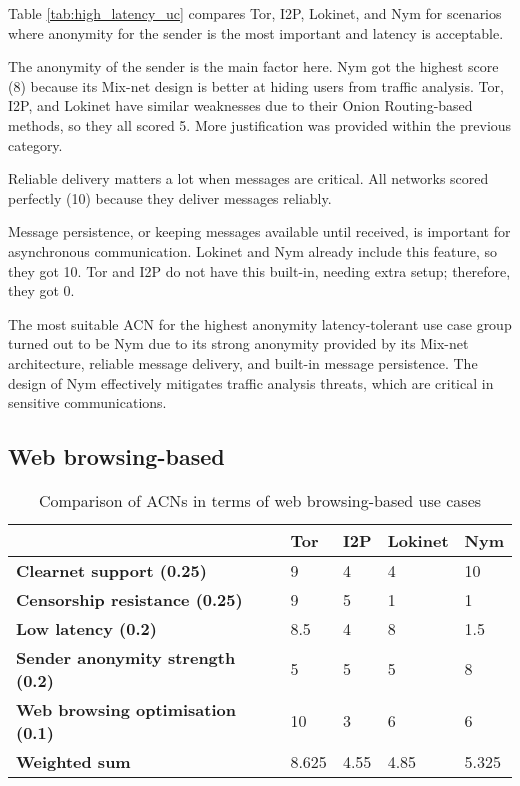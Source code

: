 Table \ref{tab:high_latency_uc} compares Tor, I2P, Lokinet, and Nym for scenarios where anonymity for the sender is the most important and latency is acceptable.

The anonymity of the sender is the main factor here. Nym got the highest score (8) because its Mix-net design is better at hiding users from traffic analysis. Tor, I2P, and Lokinet have similar weaknesses due to their Onion Routing-based methods, so they all scored 5. More justification was provided within the previous category.

Reliable delivery matters a lot when messages are critical. All networks scored perfectly (10) because they deliver messages reliably.

Message persistence, or keeping messages available until received, is important for asynchronous communication. Lokinet and Nym already include this feature, so they got 10. Tor and I2P do not have this built-in, needing extra setup; therefore, they got 0.

The most suitable ACN for the highest anonymity latency-tolerant use case group turned out to be Nym due to its strong anonymity provided by its Mix-net architecture, reliable message delivery, and built-in message persistence. The design of Nym effectively mitigates traffic analysis threats, which are critical in sensitive communications.

\subsection{Web browsing-based}

\begin{table}[!ht]
\caption{Comparison of ACNs in terms of web browsing-based use cases}
\label{tab:web_browsing_uc}
\small
\begin{tabular}{|p{}|p{}|p{}|p{}|p{}|}
\hline
\textbf{} & \textbf{Tor} & \textbf{I2P} & \textbf{Lokinet} & \textbf{Nym} \\
\hline
\textbf{Clearnet support (0.25)} & 9 & 4 & 4 & 10 \\
\hline
\textbf{Censorship resistance (0.25)} & 9 & 5 & 1 & 1 \\
\hline
\textbf{Low latency (0.2)} & 8.5 & 4 & 8 & 1.5 \\
\hline
\textbf{Sender anonymity strength (0.2)} & 5 & 5 & 5 & 8 \\
\hline
\textbf{Web browsing optimisation (0.1)} & 10 & 3 & 6 & 6 \\
\hline
\textbf{Weighted sum} & 8.625 & 4.55 & 4.85 & 5.325 \\
\hline
\end{tabular}
\end{table}


